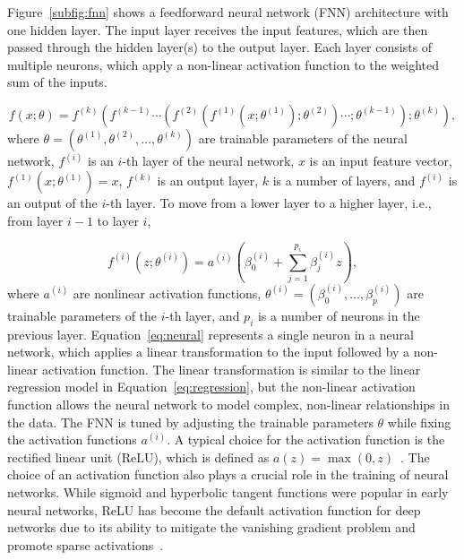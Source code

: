 Figure~\ref{subfig:fnn} shows a feedforward neural network (FNN) architecture with one hidden layer.
The input layer receives the input features, which are then passed through the hidden layer(s) to the output layer.
Each layer consists of multiple neurons, which apply a non-linear activation function to the weighted sum of the inputs.

\begin{equation}
    f(x; \theta) = f^{(k)}(f^{(k-1)} \cdots (f^{(2)}(f^{(1)}(x;\theta^{(1)});\theta^{(2)} )\cdots ;\theta^{(k-1)});\theta^{(k)}),
\end{equation}
where $\theta = (\theta^{(1)}, \theta^{(2)}, \ldots, \theta^{(k)})$ are trainable parameters of the neural network, $f^{(i)}$ is an $i$-th layer of the neural network, $x$ is an input feature vector, $f^{(1)}(x;\theta^{(1)}) = x$, $f^{(k)}$ is an output layer, $k$ is a number of layers, and $f^{(i)}$ is an output of the $i$-th layer.
To move from a lower layer to a higher layer, i.e., from layer $i-1$ to layer $i$,

\begin{equation} \label{eq:neural}
    f^{(i)}(z;\theta^{(i)}) = a^{(i)}(\beta_0^{(i)} + \sum_{j=1}^{p_i} \beta_j^{(i)} z),
\end{equation}
where $a^{(i)}$ are nonlinear activation functions, $\theta^{(i)} = (\beta_0^{(i)}, \dots, \beta_p^{(i)})$ are trainable parameters of the $i$-th layer, and $p_i$ is a number of neurons in the previous layer.
Equation~\ref{eq:neural} represents a single neuron in a neural network, which applies a linear transformation to the input followed by a non-linear activation function. 
The linear transformation is similar to the linear regression model in Equation~\ref{eq:regression}, but the non-linear activation function allows the neural network to model complex, non-linear relationships in the data.
The FNN is tuned by adjusting the trainable parameters $\theta$ while fixing the activation functions $a^{(i)}$.
A typical choice for the activation function is the rectified linear unit (ReLU), which is defined as $a(z) = \max(0, z)$~\citep{nair2010rectified}.
The choice of an activation function also plays a crucial role in the training of neural networks.
While sigmoid and hyperbolic tangent functions were popular in early neural networks, ReLU has become the default activation function for deep networks due to its ability to mitigate the vanishing gradient problem and promote sparse activations~\citep{lecun2015deep}.

